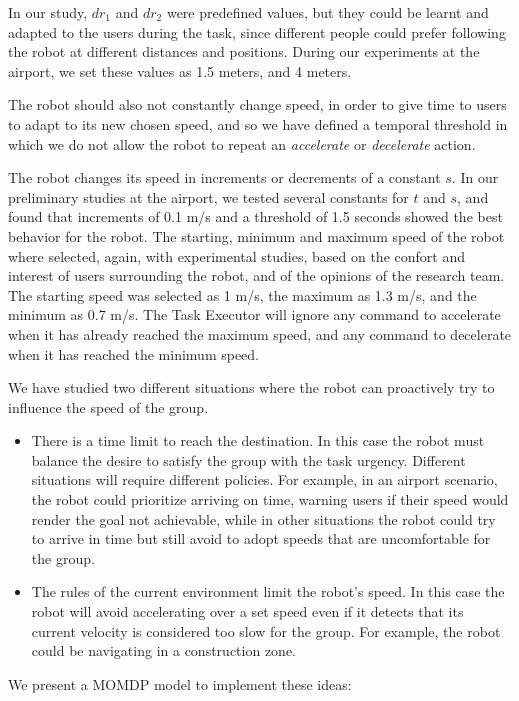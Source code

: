 In our study, $dr_1$ and $dr_2$ were predefined values, but they could be learnt and adapted to the users during the task, since different people could prefer following the robot at different distances and positions. During our experiments at the airport, we set these values as 1.5 meters, and 4 meters.

The robot should also not constantly change speed, in order to give time to users to adapt to its new chosen speed, and so we have defined a temporal threshold in which we do not allow the robot to repeat an \textit{accelerate} or \textit{decelerate} action.

The robot changes its speed in increments or decrements of a constant $s$. In our preliminary studies at the airport, we tested several constants for $t$ and $s$, and found that increments of 0.1 m/s and a threshold of 1.5 seconds showed the best behavior for the robot. The starting, minimum and maximum speed of the robot where selected, again, with experimental studies, based on the confort and interest of users surrounding the robot, and of the opinions of the research team. The starting speed was selected as 1 m/s, the maximum as 1.3 m/s, and the minimum as 0.7 m/s. The Task Executor will ignore any command to accelerate when it has already reached the maximum speed, and any command to decelerate when it has reached the minimum speed.
  
We have studied two different situations where the robot can proactively try to influence the speed of the group.
\begin{itemize}
\item There is a time limit to reach the destination. In this case the robot must balance the desire to satisfy the group with the task urgency. Different situations will require different policies. For example, in an airport scenario, the robot could prioritize arriving on time, warning users if their speed would render the goal not achievable, while in other situations the robot could try to arrive in time but still avoid to adopt speeds that are uncomfortable for the group.
\item The rules of the current environment limit the robot's speed. In this case the robot will avoid accelerating over a set speed even if it detects that its current velocity is considered too slow for the group. For example, the robot could be navigating in a construction zone.
\end{itemize}

We present a MOMDP model to implement these ideas:

